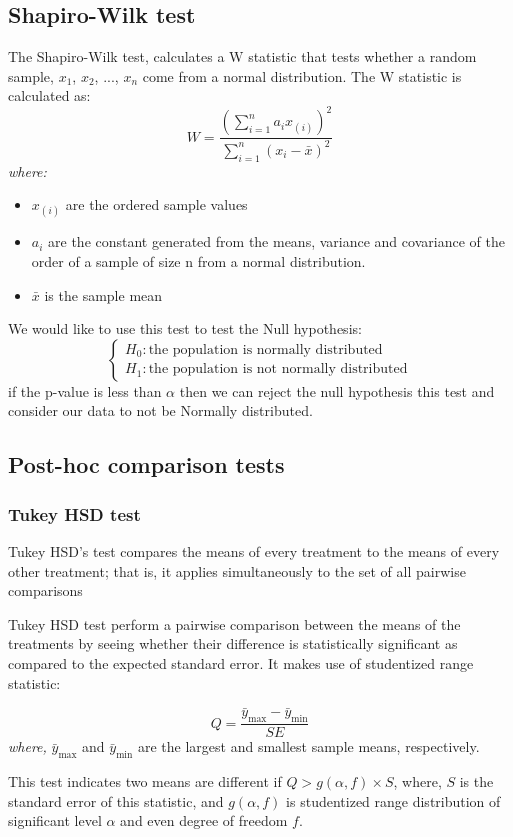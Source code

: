 \subsection{Shapiro-Wilk test}
The Shapiro-Wilk test, calculates a W statistic that tests whether a random sample, $x_1$, $x_2$, ..., $x_n$ come from a normal distribution. 
The W statistic is calculated as:
\[W = \frac{(\sum_{i=1}^{n}a_ix_{(i)})^2}{\sum_{i=1}^{n}(x_i-\bar{x})^2}\]
\textit{where:}
\begin{itemize}
    \item $x_{(i)}$ are the ordered sample values
    \item $a_i$ are the constant generated from the means, variance and covariance of the order of a sample of size n from a normal distribution.
    \item $\bar{x}$ is the sample mean
\end{itemize}

We would like to use this test to test the Null hypothesis:
\[
\begin{cases}
    H_0: \text{the population is normally distributed} \\
    H_1: \text{the population is not normally distributed}
\end{cases}
\]
if the p-value is less than $\alpha$ then we can reject the null hypothesis this test and consider our data to not be Normally distributed.

\subsection{Post-hoc comparison tests\cite{foster22}}



\subsubsection{Tukey HSD test}

Tukey HSD's test compares the means of every treatment to the means of every other treatment; 
that is, it applies simultaneously to the set of all pairwise comparisons

Tukey HSD test perform a pairwise comparison between the means of the treatments by seeing whether their difference
is statistically significant as compared to the expected standard error. It makes use of studentized range statistic:

\begin{equation}
    Q = \frac{\bar{y}_{\text{max}} - \bar{y}_{\text{min}}}{SE}
\end{equation}
\textit{where,} $\bar{y}_{\text{max}}$ and $\bar{y}_{\text{min}}$
are the largest and smallest sample means, respectively.

This test indicates two means are different if $Q > g(\alpha,f)\times S$\cite{tukey},
where, $S$ is the standard error of this statistic, and $g(\alpha,f)$ is studentized range 
distribution of significant level $\alpha$ and even degree of freedom $f$.






